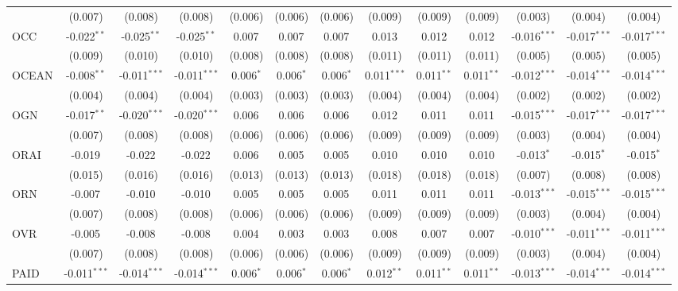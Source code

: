 \begin{table}[!htbp]
\begin{tabular}{@{\extracolsep{5pt}}lcccccccccccc}
  & (0.007) & (0.008) & (0.008) & (0.006) & (0.006) & (0.006) & (0.009) & (0.009) & (0.009) & (0.003) & (0.004) & (0.004) \\
 OCC & -0.022$^{**}$ & -0.025$^{**}$ & -0.025$^{**}$ & 0.007$^{}$ & 0.007$^{}$ & 0.007$^{}$ & 0.013$^{}$ & 0.012$^{}$ & 0.012$^{}$ & -0.016$^{***}$ & -0.017$^{***}$ & -0.017$^{***}$ \\
  & (0.009) & (0.010) & (0.010) & (0.008) & (0.008) & (0.008) & (0.011) & (0.011) & (0.011) & (0.005) & (0.005) & (0.005) \\
 OCEAN & -0.008$^{**}$ & -0.011$^{***}$ & -0.011$^{***}$ & 0.006$^{*}$ & 0.006$^{*}$ & 0.006$^{*}$ & 0.011$^{***}$ & 0.011$^{**}$ & 0.011$^{**}$ & -0.012$^{***}$ & -0.014$^{***}$ & -0.014$^{***}$ \\
  & (0.004) & (0.004) & (0.004) & (0.003) & (0.003) & (0.003) & (0.004) & (0.004) & (0.004) & (0.002) & (0.002) & (0.002) \\
 OGN & -0.017$^{**}$ & -0.020$^{***}$ & -0.020$^{***}$ & 0.006$^{}$ & 0.006$^{}$ & 0.006$^{}$ & 0.012$^{}$ & 0.011$^{}$ & 0.011$^{}$ & -0.015$^{***}$ & -0.017$^{***}$ & -0.017$^{***}$ \\
  & (0.007) & (0.008) & (0.008) & (0.006) & (0.006) & (0.006) & (0.009) & (0.009) & (0.009) & (0.003) & (0.004) & (0.004) \\
 ORAI & -0.019$^{}$ & -0.022$^{}$ & -0.022$^{}$ & 0.006$^{}$ & 0.005$^{}$ & 0.005$^{}$ & 0.010$^{}$ & 0.010$^{}$ & 0.010$^{}$ & -0.013$^{*}$ & -0.015$^{*}$ & -0.015$^{*}$ \\
  & (0.015) & (0.016) & (0.016) & (0.013) & (0.013) & (0.013) & (0.018) & (0.018) & (0.018) & (0.007) & (0.008) & (0.008) \\
 ORN & -0.007$^{}$ & -0.010$^{}$ & -0.010$^{}$ & 0.005$^{}$ & 0.005$^{}$ & 0.005$^{}$ & 0.011$^{}$ & 0.011$^{}$ & 0.011$^{}$ & -0.013$^{***}$ & -0.015$^{***}$ & -0.015$^{***}$ \\
  & (0.007) & (0.008) & (0.008) & (0.006) & (0.006) & (0.006) & (0.009) & (0.009) & (0.009) & (0.003) & (0.004) & (0.004) \\
 OVR & -0.005$^{}$ & -0.008$^{}$ & -0.008$^{}$ & 0.004$^{}$ & 0.003$^{}$ & 0.003$^{}$ & 0.008$^{}$ & 0.007$^{}$ & 0.007$^{}$ & -0.010$^{***}$ & -0.011$^{***}$ & -0.011$^{***}$ \\
  & (0.007) & (0.008) & (0.008) & (0.006) & (0.006) & (0.006) & (0.009) & (0.009) & (0.009) & (0.003) & (0.004) & (0.004) \\
 PAID & -0.011$^{***}$ & -0.014$^{***}$ & -0.014$^{***}$ & 0.006$^{*}$ & 0.006$^{*}$ & 0.006$^{*}$ & 0.012$^{**}$ & 0.011$^{**}$ & 0.011$^{**}$ & -0.013$^{***}$ & -0.014$^{***}$ & -0.014$^{***}$ \\

\end{tabular}
\end{table}
